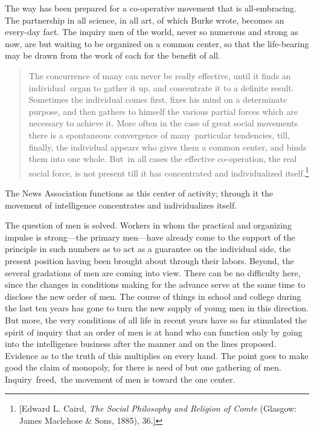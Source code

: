 \documentclass[twoside,symmetric,nobib,justified]{tufte-book}
\begin{document}
The way has been prepared for a co-operative movement that is
all-embracing. The partnership in all science, in all art, of which
Burke wrote, becomes an every-day fact. The inquiry men of the world,
never so numerous and strong as now, are but waiting to be organized on
a common center, so that the life-bearing may be drawn from the work of
each for the benefit of all.

\begin{quote}
The concurrence of many can never be really effective, until it finds an
individual~organ to gather it up, and concentrate it to a definite
result. Sometimes the individual comes first, fixes his mind on a
determinate purpose, and then gathers to himself the various partial
forces which are necessary to achieve it. More often in the case of
great social movements there is a spontaneous convergence of
many~particular tendencies, till, finally, the individual appears who
gives them a common center, and binds them into one whole. But~in all
cases the effective co-operation, the real social force, is not present
till it has concentrated and individualized itself.\footnote{{[}Edward
  L. Caird, \emph{The Social Philosophy and Religion of Comte} (Glasgow:
  James Maclehose \& Sons, 1885),
  36.\href{applewebdata://D02306DF-3E46-4684-BD1A-1A323FFB2CB2\#_msocom_1}{{]}}}
\end{quote}

\noindent The News Association functions as this center of activity; through it
the movement of intelligence concentrates and individualizes itself.~

The question of men is solved. Workers in whom the practical and
organizing impulse is strong---the primary men---have already come to
the support of the principle in such numbers as to act as a guarantee on
the individual side, the present position having been brought about
through their labors. Beyond, the several gradations of men are coming
into view. There can be no difficulty here, since the changes in
conditions making for the advance serve at the same time to disclose the
new order of men. The course of things in school and college during the
last ten years has gone to turn the new supply of young men in this
direction. But more, the very conditions of all life in recent years
have so far stimulated the spirit of inquiry that an order of men is at
hand who can function only by going into the intelligence business after
the manner and on the lines proposed. Evidence as to the truth of this
multiplies on every hand. The point goes to make good the claim of
monopoly, for there is need of but one gathering of men.
Inquiry~freed,~the movement of men is toward the one center.~
\end{document}
